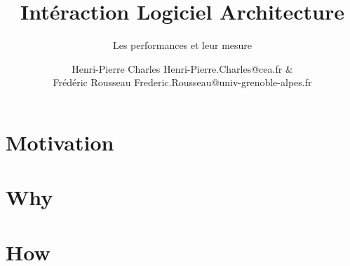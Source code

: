 \documentclass[aspectratio=169]{beamer}
\title{Intéraction Logiciel Architecture}
\subtitle{Les performances et leur mesure}
\author{Henri-Pierre Charles Henri-Pierre.Charles@cea.fr \& \\
Frédéric Rousseau Frederic.Rousseau@univ-grenoble-alpes.fr}
\date{}
\newcommand{\Slide}[1]{}
\begin{document}
\begin{frame}
\titlepage
\end{frame}

\section{Motivation}
\Slide{Metrics/HowMany}
\Slide{Metrics/Moore}
\Slide{Metrics/Top500}
\Slide{Metrics/Opportunity}

\begin{frame}
  \begin{multicols}{2}
    \tableofcontents[]
  \end{multicols}
\end{frame}
\section{Why}
\Slide{Metrics/VonNeumann}
\Slide{Metrics/HowToMeasure}
\Slide{Metrics/FLOPS}
\Slide{Metrics/Sustained}
\Slide{Metrics/FLOPS}
\Slide{Metrics/IPC}
\Slide{Metrics/Lois}
\Slide{Metrics/Speedup}
\Slide{Metrics/Amdahl}
\Slide{Metrics/Roofline}
\Slide{Metrics/Roofline2}

\section{How}
\Slide{Comment/Outillage}
\Slide{Comment/C2}
\Slide{Comment/gprof}
\Slide{Comment/PerfCounter}
\Slide{Comment/JTAG}
\Slide{Comment/FPGA}
\Slide{Comment/HwEmulator}
\Slide{Comment/gdb}
\Slide{Comment/qemu}
\Slide{Comment/CrossCompiler}
\Slide{Comment/Stats}
\end{document}
